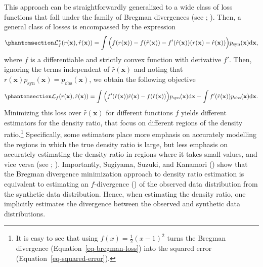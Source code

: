 \documentclass[
]{article}
\newcommand{\pobs}{p_{\text{obs}}}
\newcommand{\psyn}{p_{\text{syn}}}
\newcommand{\bx}{\mathbf{x}}
\begin{document}
This approach can be straightforwardly generalized to a wide class of
loss functions that fall under the family of Bregman divergences (see
; ). Then, a general class of losses is encompassed by the expression
\begin{equation}\phantomsection\label{eq-bregman-loss}{
\mathcal{L}^*_f (r(\bx), \hat{r}(\bx)) =
\int \Big(
f(r(\bx)) - f(\hat{r}(\bx)) - f'(\hat{r}(\bx))(r(\bx) - \hat{r}(\bx))
\Big) \psyn(\bx) \text{d}\bx,
}\end{equation} where \(f\) is a differentiable and strictly convex
function with derivative \(f'\). Then, ignoring the terms independent of
\(\hat{r}(\bx)\) and noting that \(r(\bx)\psyn(\bx) = \pobs(\bx)\), we
obtain the following objective
\begin{equation}\phantomsection\label{eq-bregman-objective}{
\mathcal{L}_f (r(\bx), \hat{r}(\bx)) = \int 
\Big( 
f'(\hat{r}(\bx)) \hat{r}(\bx) - f(\hat{r}(\bx))
\Big)  \psyn(\bx) \text{d}\bx
- \int f'(\hat{r}(\bx)) \pobs(\bx)
\text{d}\bx.
}\end{equation} Minimizing this loss over \(\hat{r}(\bx)\) for different
functions \(f\) yields different estimators for the density ratio, that
focus on different regions of the density ratio.\footnote{It is easy to
  see that using \(f(x) = \frac{1}{2}(x-1)^2\) turns the Bregman
  divergence (Equation~\ref{eq-bregman-loss}) into the squared error
  (Equation~\ref{eq-squared-error}).} Specifically, some estimators
place more emphasis on accurately modelling the regions in which the
true density ratio is large, but less emphasis on accurately estimating
the density ratio in regions where it takes small values, and vice versa
(see ; ).
Importantly, Sugiyama, Suzuki, and Kanamori
() show that the Bregman
divergence minimization approach to density ratio estimation is
equivalent to estimating an \(f\)-divergence
() of the
observed data distribution from the synthetic data distribution. Hence,
when estimating the density ratio, one implicitly estimates the
divergence between the observed and synthetic data distributions.
\end{document}
